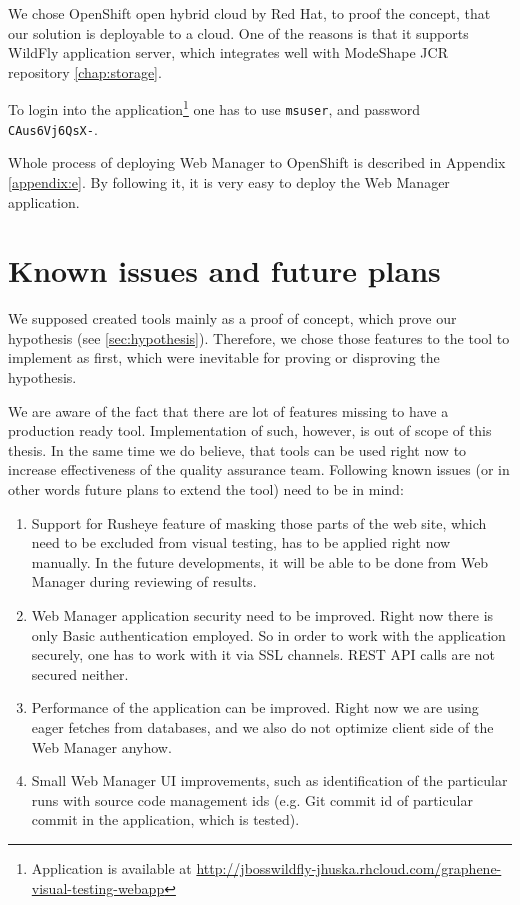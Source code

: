 \documentclass[11pt,oneside,final]{fithesis2}
\begin{document}
  We chose OpenShift open hybrid cloud by Red Hat, to proof the concept, that our solution is deployable to a cloud. One of the
  reasons is that it supports WildFly application server, which integrates well with ModeShape JCR repository \ref{chap:storage}.
  
  To login into the application\footnote{Application is available at 
  \url{http://jbosswildfly-jhuska.rhcloud.com/graphene-visual-testing-webapp}} one has to 
  use \texttt{msuser}, and password \texttt{CAus6Vj6QsX-}.
  
  Whole process of deploying Web Manager to OpenShift is described in Appendix \ref{appendix:e}. By following it, it is very easy
  to deploy the Web Manager application.
  
\chapter{Known issues and future plans}
We supposed created tools mainly as a proof of concept, which prove our hypothesis (see \ref{sec:hypothesis}). Therefore, we chose those features
to the tool to implement as first, which were inevitable for proving or disproving the hypothesis.

We are aware of the fact that there are lot of features missing to have a production ready tool. Implementation of such, however, is out
of scope of this thesis. In the same time we do believe, that tools can be used right now to increase effectiveness of the quality assurance
team. Following known issues (or in other words future plans to extend the tool) need to be in mind:

\begin{enumerate}
 \item Support for Rusheye feature of masking those parts of the web site, which need to be excluded from visual testing, has to be applied
 right now manually. In the future developments, it will be able to be done from Web Manager during reviewing of results.
 \item Web Manager application security need to be improved. Right now there is only Basic authentication employed. So in order to work
 with the application securely, one has to work with it via SSL channels. REST API calls are not secured neither.
 \item Performance of the application can be improved. Right now we are using eager fetches from databases, and we also do not optimize
 client side of the Web Manager anyhow.
 \item Small Web Manager UI improvements, such as identification of the particular runs with source code management ids (e.g. Git commit id of
 particular commit in the application, which is tested).
\end{enumerate}
\end{document}
